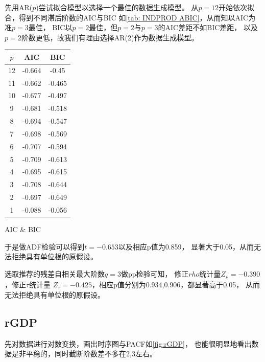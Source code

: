 \documentclass[cn]{homework}
\begin{document}
    先用AR($p$)尝试拟合模型以选择一个最佳的数据生成模型。
    从$p=12$开始依次拟合，得到不同滞后阶数的AIC与BIC
    如\cref{tab: INDPROD ABIC}，从而知以AIC为准$p=3$最佳，
    BIC以$p=2$最佳，但$p=2$与$p=3$的AIC差距不如BIC差距，
    以及$p=2$阶数更低，故我们有理由选择AR(2)作为数据生成模型。

    \begin{margintable}
        \centering
        \begin{tabular}{ccc}
            \toprule
            $p$ & AIC & BIC \\
            \midrule
            12 & -0.664 & -0.45 \\
            11 & -0.662 & -0.465 \\
            10 & -0.677 & -0.497 \\
            9 & -0.681 & -0.518 \\
            8 & -0.694 & -0.547 \\
            7 & -0.698 & -0.569 \\
            6 & -0.707 & -0.594 \\
            5 & -0.709 & -0.613 \\
            4 & -0.695 & -0.615 \\
            3 & -0.708 & -0.644 \\
            2 & -0.697 & -0.649 \\
            1 & -0.088 & -0.056 \\
            \bottomrule
        \end{tabular}
        \caption{AIC \& BIC}
        \label{tab: INDPROD ABIC}
    \end{margintable}

    于是做ADF检验可以得到$t=-0.653$以及相应p值为0.859，
    显著大于0.05，从而无法拒绝具有单位根的原假设。

    选取推荐的残差自相关最大阶数$q=3$做pp检验可知，
    修正$rho$统计量$Z_\rho=-0.390$，修正$\tau$统计量
    $Z_\tau=-0.425$，相应p值分别为0.934,0.906，都显著高于0.05，
    从而无法拒绝具有单位根的原假设。

    \subsection{rGDP}
    先对数据进行对数变换，画出时序图与PACF如\cref{fig:rGDP}，
    也能很明显地看出数据是非平稳的，同时截断阶数差不多在2,3左右。
\end{document}
